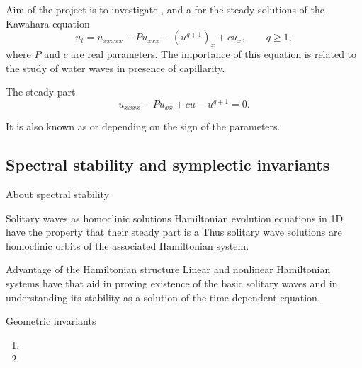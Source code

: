 \documentclass[9pt, english]{beamer}
\theoremstyle{definition}
\begin{document}
\begin{frame}{Aim of the project is to}
 investigate \pause
{}, \pause
{} \pause and a
 \pause
for the steady solutions of the Kawahara equation
\[
u_t=u_{xxxxx}-Pu_{xxx}-(u^{q+1})_x +c u_x, \qquad q \geq 1,
\]
where $P$ and $ c$ are real parameters.\pause
The importance of this equation is related to the study of water waves in presence of capillarity.\pause

    \begin{block}{The steady part}
        \[
        u_{xxxx}-Pu_{xx} + cu -u^{q+1}=0.
        \]
    \end{block}\pause
        It is also known as  \pause or  depending on the sign of the parameters.
\end{frame}

\subsection{Spectral stability and symplectic invariants}
\begin{frame}{About spectral stability}\pause
    \begin{block}{Solitary waves as homoclinic solutions}\pause
        Hamiltonian evolution equations in 1D have the property that
        their steady part is a  \pause Thus solitary wave solutions are homoclinic
        orbits of the associated Hamiltonian system.
    \end{block}
    \pause
    \begin{block}{Advantage of the Hamiltonian structure}\pause
        Linear and nonlinear Hamiltonian systems have  that aid in proving existence of the
        basic solitary waves \pause and in understanding its stability as a
        solution of the time dependent equation.
    \end{block}\pause
    \begin{block}{Geometric invariants}\pause
    \begin{enumerate}
    \item {}\pause
    \item {}
    \end{enumerate}
    \end{block}
    \end{frame}
\end{document}
